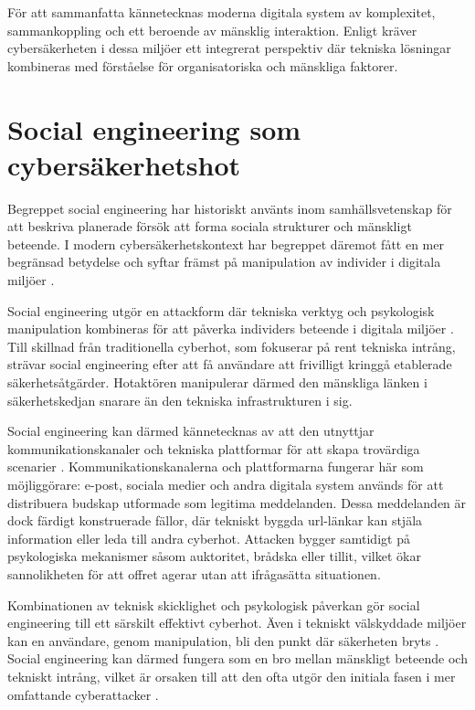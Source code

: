 För att sammanfatta kännetecknas moderna digitala system av komplexitet, sammankoppling och ett beroende av mänsklig interaktion. Enligt \cite{washo2021interdisciplinary, enisa2018cybersecurity_culture} 
kräver cybersäkerheten i dessa miljöer ett integrerat perspektiv där tekniska lösningar kombineras med förståelse för organisatoriska och mänskliga faktorer.

\section{Social engineering som cybersäkerhetshot}
Begreppet social engineering har historiskt använts inom samhällsvetenskap för att beskriva planerade försök att forma sociala strukturer och mänskligt beteende. 
I modern cybersäkerhetskontext har begreppet däremot fått en mer begränsad betydelse och syftar främst på manipulation av individer i digitala miljöer \cite{podgorecki1998social}.

Social engineering utgör en attackform där tekniska verktyg och psykologisk manipulation kombineras för att påverka individers beteende i digitala miljöer \cite{springer_social_engineering_ontology, gururaj2024social_engineering}. 
Till skillnad från traditionella cyberhot, som fokuserar på rent tekniska intrång, strävar social engineering efter att få användare att frivilligt kringgå etablerade säkerhetsåtgärder. 
Hotaktören manipulerar därmed den mänskliga länken i säkerhetskedjan snarare än den tekniska infrastrukturen i sig.

Social engineering kan därmed kännetecknas av att den utnyttjar kommunikationskanaler och tekniska plattformar för att skapa trovärdiga scenarier \cite{se_threat_defense_survey, algarni2019se_survey}. 
Kommunikationskanalerna och plattformarna fungerar här som möjliggörare: e-post, sociala medier och andra digitala system används för att distribuera budskap utformade som legitima meddelanden. 
Dessa meddelanden är dock färdigt konstruerade fällor, där tekniskt byggda url-länkar kan stjäla information eller leda till andra cyberhot. Attacken bygger samtidigt på psykologiska mekanismer såsom 
auktoritet, brådska eller tillit, vilket ökar sannolikheten för att offret agerar utan att ifrågasätta situationen.

Kombinationen av teknisk skicklighet och psykologisk påverkan gör social engineering till ett särskilt effektivt cyberhot. Även i tekniskt välskyddade miljöer kan en användare, genom manipulation, 
bli den punkt där säkerheten bryts \cite{washo2021interdisciplinary}. Social engineering kan därmed fungera som en bro mellan mänskligt beteende och tekniskt intrång, vilket är orsaken till att den 
ofta utgör den initiala fasen i mer omfattande cyberattacker \cite{algarni2019se_survey}. 

